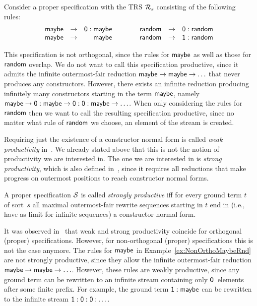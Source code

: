\documentclass{eptcs}
\begin{document}
\begin{example}
\label{ex:NonOrthoMaybeRnd}
Consider a proper specification with the TRS $\mathcal{R}_s$ consisting of the following
rules:
\[
\begin{array}{rcl@{\qquad\qquad}rcl}
    \fsym{maybe} &\to& \zero : \fsym{maybe}
&
    \fsym{random} &\to& \zero : \fsym{random}
\\
    \fsym{maybe} &\to& \phantom{\zero:\fsym{maybe}}\mathllap{\fsym{maybe}}
&
    \fsym{random} &\to& \one : \fsym{random}
\end{array}
\]

This specification is not orthogonal, since the rules for $\mathsf{maybe}$ as well
as those for $\mathsf{random}$ overlap.
We do not want to call this specification productive, since it admits the
infinite outermost-fair reduction $\mathsf{maybe} \to \mathsf{maybe} \to \ldots$
that never produces any constructors. However, there exists an infinite
reduction producing infinitely many constructors starting in the term
$\mathsf{maybe}$, namely
$\mathsf{maybe} \to \mathsf{0} : \mathsf{maybe}
\to \mathsf{0} : \mathsf{0} : \mathsf{maybe} \to \ldots$.
When only considering the rules for $\mathsf{random}$ then we want to call
the resulting specification productive, since no matter what rule of
$\mathsf{random}$ we choose, an element of the stream is created.
\end{example}

Requiring just the existence of a constructor normal form is called
\emph{weak productivity} in~\cite{EGH09,End10}. We already stated above that
this is not the notion of productivity we are interested in. The one we are
interested in is \emph{strong productivity}, which is also defined
in~\cite{EGH09,End10}, since it requires all reductions that make progress on
outermost positions to reach constructor normal forms.

\begin{definition}
\label{def:StrongProd}
A proper specification $\mathcal{S}$ is called \emph{strongly productive} iff for
every ground term $t$ of sort~$s$ all maximal outermost-fair rewrite sequences
starting in $t$ end in (i.e., have as limit for infinite sequences)
a constructor normal form.
\end{definition}

It was observed in~\cite{EGH09,End10} that weak and strong productivity coincide
for orthogonal (proper) specifications.
However, for non-orthogonal (proper) specifications this is not the case
anymore.
The rules for $\mathsf{maybe}$ in Example~\ref{ex:NonOrthoMaybeRnd} are not
strongly productive, since they allow the infinite outermost-fair reduction
$\mathsf{maybe} \to \mathsf{maybe} \to \ldots$. However, these rules are weakly
productive, since any ground term can be rewritten to an infinite stream
containing only $\mathsf{0}$~elements after some finite prefix.
For example, the ground term $\mathsf{1} : \mathsf{maybe}$ can be rewritten to the
infinite stream $\mathsf{1} : \mathsf{0} : \mathsf{0} : \ldots$.
\end{document}
